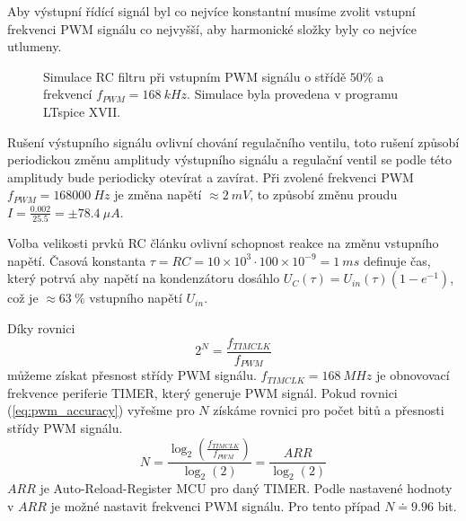 Aby výstupní řídící signál byl co nejvíce konstantní musíme zvolit vstupní frekvenci PWM signálu co nejvyšší, aby harmonické složky byly co nejvíce utlumeny.

\begin{figure}[H]
    \caption{Simulace RC filtru při vstupním PWM signálu o střídě $50\%$ a frekvencí $f_{PWM} = 168 \ kHz $. Simulace byla provedena v programu LTspice XVII.}
    \label{fig:filtered_pwm}
\end{figure}

Rušení výstupního signálu ovlivní chování regulačního ventilu, toto rušení způsobí periodickou změnu amplitudy výstupního signálu a regulační ventil se podle této amplitudy bude periodicky otevírat a zavírat. Při zvolené frekvenci PWM $f_{PWM} = 168000 \ Hz $ je změna napětí $\approx 2 \ mV$, to způsobí změnu proudu $I = \frac{0.002}{25.5} = \pm 78.4 \ \mu A $. \par
Volba velikosti prvků RC článku ovlivní schopnost reakce na změnu vstupního napětí.
Časová konstanta $\tau = RC = 10 \times 10^{3} \cdot 100 \times 10^{-9}= 1\ ms$ definuje čas, který potrvá aby napětí na kondenzátoru dosáhlo $U_{C}(\tau) = U_{in}(\tau)(1 - e^{-1})$, což je $\approx 63 \ \% $ vstupního napětí $U_{in}$.

\par
Díky rovnici
\begin{equation} \label{eq:pwm_accuracy}
    2^N = \frac{f_{TIMCLK}}{f_{PWM}}
\end{equation}
můžeme získat přesnost střídy PWM signálu. $f_{TIMCLK} = 168 \ MHz$ je obnovovací frekvence periferie TIMER, který generuje PWM signál. Pokud rovnici (\ref{eq:pwm_accuracy}) vyřešme pro $N$ získáme rovnici pro počet bitů a přesnosti střídy PWM signálu.
\begin{equation}
    N = \frac{\log_{2} (\frac{f_{TIMCLK}}{f_{PWM}})}{\log_{2}(2)} = \frac{ARR}{\log_{2}(2)}
\end{equation}
$ARR$ je Auto-Reload-Register MCU pro daný TIMER. Podle nastavené hodnoty v $ARR$ je možné nastavit frekvenci PWM signálu. Pro tento případ $N \doteq 9.96 $ bit.

